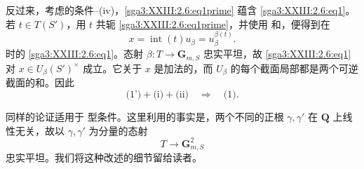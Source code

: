 反过来，考虑的条件--(iv)，\eqref{sga3:XXIII:2.6:eq1prime} 蕴含 \eqref{sga3:XXIII:2.6:eq1}。若 \(t\in T(S')\)，用 \(t\) 共轭 \eqref{sga3:XXIII:2.6:eq1prime}，并使用 和，便得到在
\[
  x=\operatorname{int}(t)u_\beta=u_\beta^{\beta(t)}.
\]
时的 \eqref{sga3:XXIII:2.6:eq1}。态射 \(\beta:T\to\mathbf G_{m,S}\) 忠实平坦，故 \eqref{sga3:XXIII:2.6:eq1} 对 \(x\in U_\beta(S')^\times\) 成立。它关于 \(x\) 是加法的，而 \(U_\beta\) 的每个截面局部都是两个可逆截面的和。因此
\[
  \text{(1')}+\text{(i)}+\text{(ii)}
    \quad\Longrightarrow\quad\text{(1)}.
\]

同样的论证适用于 型条件。这里利用的事实是，两个不同的正根 \(\gamma,\gamma'\) 在 \(\mathbf Q\) 上线性无关，故以 \(\gamma,\gamma'\) 为分量的态射
\[
  T\longrightarrow\mathbf G_{m,S}^2
\]
忠实平坦。我们将这种改述的细节留给读者。


